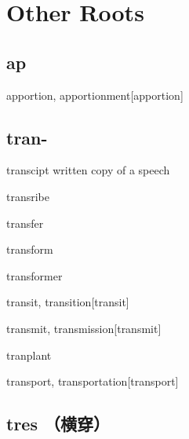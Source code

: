 \chapter{Other Roots}

\section{ap}

\begin{wordRef}{apportion, apportionment}[apportion]
\end{wordRef}

\section{tran-}

\begin{wordRef}{transcipt}
    written copy of a speech
\end{wordRef}

\begin{wordRef}{transribe}
\end{wordRef}

\begin{wordRef}{transfer}
\end{wordRef}

\begin{wordRef}{transform}
\end{wordRef}

\begin{wordRef}{transformer}
\end{wordRef}

\begin{wordRef}{transit, transition}[transit]
\end{wordRef}

\begin{wordRef}{transmit, transmission}[transmit]
\end{wordRef}

\begin{wordRef}{tranplant}
\end{wordRef}

\begin{wordRef}{transport, transportation}[transport]
\end{wordRef}

\section{tres （横穿）}

